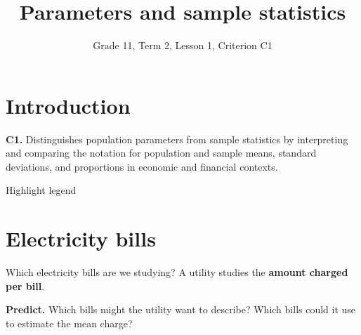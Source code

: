 \documentclass[12pt,aspectratio=169]{beamer}
\title{Parameters and sample statistics}
\subtitle{Grade 11, Term 2, Lesson 1, Criterion C1}
\author{}
\date{}
\newcommand{\RevealLegendCell}[2]{\leavevmode\visible<#1->{#2}}
\begin{document}
\section{Introduction}

\begin{frame}
  \vfill
  {\color{LessonTeal}\bfseries\insertsubtitle\par}
  \medskip
  {\huge\bfseries\inserttitle\par}
  \bigskip
  \textbf{C1.} Distinguishes population parameters from sample statistics by
  interpreting and comparing the notation for population and sample means,
  standard deviations, and proportions in economic and financial contexts.
  \vfill
\end{frame}

\begin{frame}[t]{Highlight legend}
  \let\PracticeHighlightLegendCell\RevealLegendCell
\end{frame}

\section{Electricity bills}

\begin{frame}[t]{Which electricity bills are we studying?}
  A utility studies the \textbf{amount charged per bill}.

  \medskip
  \textbf{Predict.} Which bills might the utility want to describe?
  Which bills could it use to estimate the mean charge?

  \bigskip
  \par
  \medskip
\end{frame}
\end{document}
